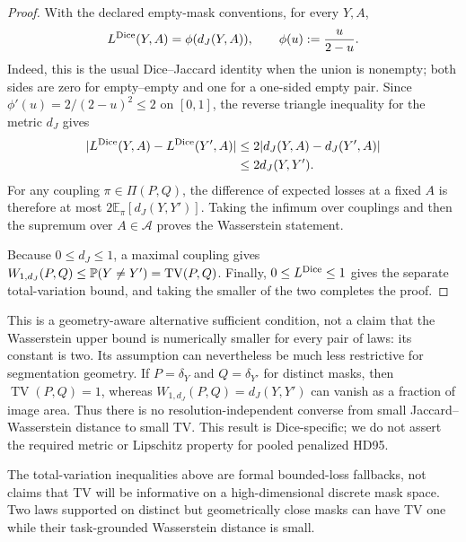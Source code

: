 \begin{proof}
With the declared empty-mask conventions, for every $Y,A$,
\begin{equation*}
  L^{\operatorname{Dice}}(Y,A)
  =\phi(d_J(Y,A)),
  \qquad
  \phi(u):=\frac{u}{2-u}.
\end{equation*}
Indeed, this is the usual Dice--Jaccard identity when the union is nonempty;
both sides are zero for empty--empty and one for a one-sided empty pair. Since
$\phi'(u)=2/(2-u)^2\leq2$ on $[0,1]$, the reverse triangle inequality for the
metric $d_J$ gives
\begin{align*}
  |L^{\operatorname{Dice}}(Y,A)-L^{\operatorname{Dice}}(Y',A)|
  &\leq2|d_J(Y,A)-d_J(Y',A)|\\
  &\leq2d_J(Y,Y').
\end{align*}
For any coupling $\pi\in\Pi(P,Q)$, the difference of expected losses at a
fixed $A$ is therefore at most
$2\mathbb E_\pi[d_J(Y,Y')]$. Taking the infimum over couplings and then the
supremum over $A\in\mathcal A$ proves the Wasserstein statement.

Because $0\leq d_J\leq1$, a maximal coupling gives
$W_{1,d_J}(P,Q)\leq\mathbb{P}(Y\neq Y')=\operatorname{TV}(P,Q)$. Finally,
$0\leq L^{\operatorname{Dice}}\leq1$ gives the separate total-variation bound, and taking
the smaller of the two completes the proof.
\end{proof}

This is a geometry-aware alternative sufficient condition, not a claim that
the Wasserstein upper bound is numerically smaller for every pair of laws: its
constant is two. Its assumption can nevertheless be much less restrictive for
segmentation geometry. If $P=\delta_Y$ and $Q=\delta_{Y'}$ for distinct masks,
then $\operatorname{TV}(P,Q)=1$, whereas
$W_{1,d_J}(P,Q)=d_J(Y,Y')$ can vanish as a fraction of image area. Thus there
is no resolution-independent converse from small Jaccard--Wasserstein distance
to small TV. This result is Dice-specific; we do not assert the required metric
or Lipschitz property for pooled penalized HD95.

The total-variation inequalities above are formal bounded-loss fallbacks, not
claims that TV will be informative on a high-dimensional discrete mask space.
Two laws supported on distinct but geometrically close masks can have TV one
while their task-grounded Wasserstein distance is small.

